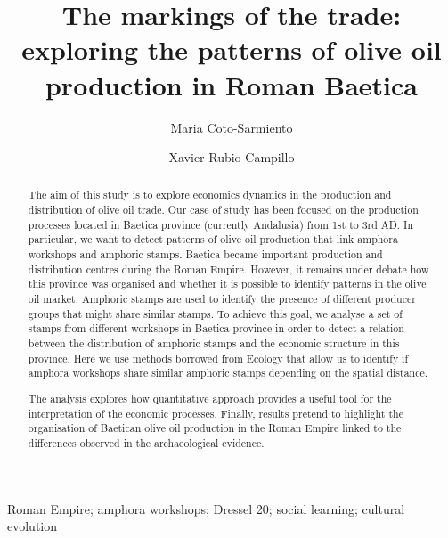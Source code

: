 \documentclass[review]{elsarticle}
\begin{document}
\begin{frontmatter}

\title{The markings of the trade: exploring the patterns of olive oil production in Roman Baetica}

\author[ceipacadress]{Maria Coto-Sarmiento}


\author[edadress]{Xavier Rubio-Campillo}

\address[edadress]{School of History, Classic \& Archaeology, Room OOM.33, William Robertson Wing, Old Medical School, Teviot Place, University of Edinburgh, UK}
\address[ceipacadress]{CEIPAC, Department of Prehistory and Archaeology, Montalegre, 6-8, 08001, University of Barcelona, Barcelona, Spain}

\begin{keyword}
Roman Empire; amphora workshops; Dressel 20; social learning; cultural evolution
\end{keyword}


\end{frontmatter}

\begin{abstract}

The aim of this study is to explore economics dynamics in the production and distribution of olive oil trade. 
Our case of study has been focused on the production processes located in Baetica province (currently Andalusia) from 1st to 3rd AD. In particular, we want to detect patterns of olive oil production that link amphora workshops and amphoric stamps. Baetica became important production and distribution centres during the Roman Empire. However, it remains under debate how this province was organised and whether it is possible to identify patterns in the olive oil market. Amphoric stamps are used to identify the presence of different producer groups that might share similar stamps. To achieve this goal, we analyse a set of stamps from different workshops in Baetica province in order to detect a relation between the distribution of amphoric stamps and the economic structure in this province. Here we use methods borrowed from Ecology that allow us to identify if amphora workshops share similar amphoric stamps depending on the spatial distance. 

The analysis explores how quantitative approach provides a useful tool for the interpretation of the economic processes. Finally, results pretend to highlight the organisation of Baetican olive oil production in the Roman Empire linked to the differences observed in the archaeological evidence.

\end{abstract}
\end{document}
